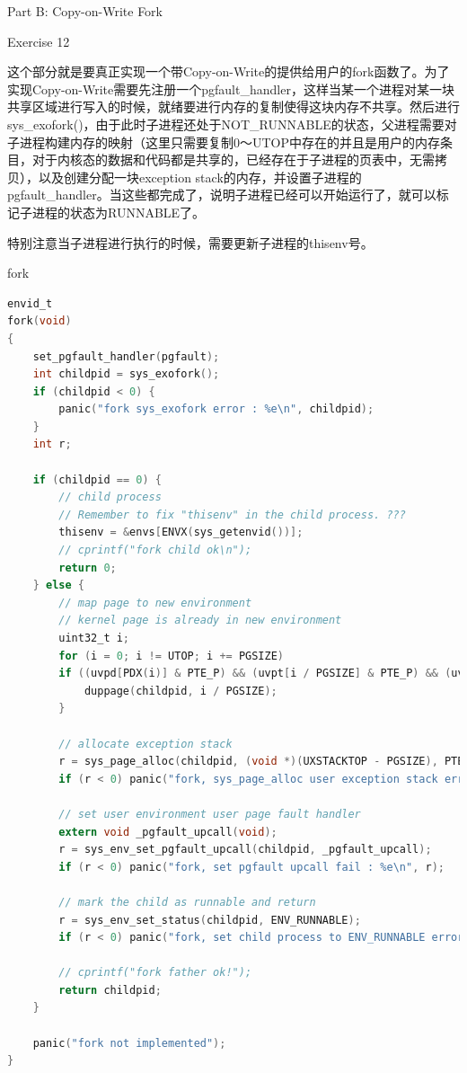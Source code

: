 \documentclass[GBK,winfonts,a4paper,10pt]{ctexart}
\begin{document}
\begin{section}{Part B: Copy-on-Write Fork}
\begin{subsection}{ Exercise 12 }
\par
这个部分就是要真正实现一个带Copy-on-Write的提供给用户的fork函数了。为了实现Copy-on-Write需要先注册一个pgfault\_handler，这样当某一个进程对某一块共享区域进行写入的时候，就绪要进行内存的复制使得这块内存不共享。然后进行sys\_exofork()，由于此时子进程还处于NOT\_RUNNABLE的状态，父进程需要对子进程构建内存的映射（这里只需要复制0～UTOP中存在的并且是用户的内存条目，对于内核态的数据和代码都是共享的，已经存在于子进程的页表中，无需拷贝），以及创建分配一块exception stack的内存，并设置子进程的pgfault\_handler。当这些都完成了，说明子进程已经可以开始运行了，就可以标记子进程的状态为RUNNABLE了。
\par
特别注意当子进程进行执行的时候，需要更新子进程的thisenv号。
\begin{subsubsection}{ fork }
\begin{lstlisting}[language = C]
envid_t
fork(void)
{
	set_pgfault_handler(pgfault);
	int childpid = sys_exofork();
	if (childpid < 0) {
		panic("fork sys_exofork error : %e\n", childpid);
	}
	int r;

	if (childpid == 0) {
		// child process
		// Remember to fix "thisenv" in the child process. ??? 
		thisenv = &envs[ENVX(sys_getenvid())];
		// cprintf("fork child ok\n");
		return 0;
	} else {
		// map page to new environment
		// kernel page is already in new environment
		uint32_t i;
		for (i = 0; i != UTOP; i += PGSIZE) 
		if ((uvpd[PDX(i)] & PTE_P) && (uvpt[i / PGSIZE] & PTE_P) && (uvpt[i / PGSIZE] & PTE_U)) {
			duppage(childpid, i / PGSIZE);
		}

		// allocate exception stack
		r = sys_page_alloc(childpid, (void *)(UXSTACKTOP - PGSIZE), PTE_U | PTE_W | PTE_P);
		if (r < 0) panic("fork, sys_page_alloc user exception stack error : %e\n", r);

		// set user environment user page fault handler 
		extern void _pgfault_upcall(void);
		r = sys_env_set_pgfault_upcall(childpid, _pgfault_upcall);
		if (r < 0) panic("fork, set pgfault upcall fail : %e\n", r);

		// mark the child as runnable and return
		r = sys_env_set_status(childpid, ENV_RUNNABLE);
		if (r < 0) panic("fork, set child process to ENV_RUNNABLE error : %e\n", r);

		// cprintf("fork father ok!");
		return childpid;
	}

	panic("fork not implemented");
}
\end{lstlisting}
\end{subsubsection}


\end{subsection}
\end{section}
\end{document}
